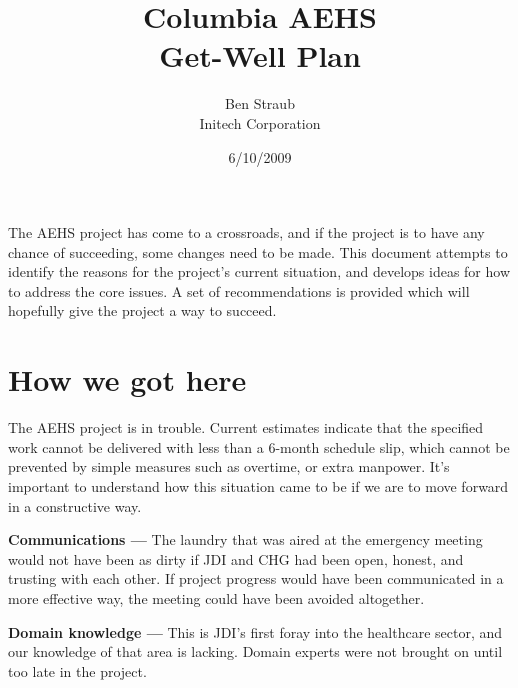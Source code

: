 \documentclass[12pt]{article}
\begin{document}

\title{Columbia AEHS\\Get-Well Plan}
\author{Ben Straub\\Initech Corporation}
\date{6/10/2009}
\maketitle
\thispagestyle{empty}



\vskip 1in

\todo{} The AEHS project has come to a crossroads, and if the project is to have any chance of
succeeding, some changes need to be made.  This document attempts to identify the reasons for the
project's current situation, and develops ideas for how to address the core issues.  A set of
recommendations is provided which will hopefully give the project a way to succeed.

\clearpage

\setcounter{tocdepth}{1}
\tableofcontents

\clearpage


\section{How we got here}

The AEHS project is in trouble.  Current estimates indicate that the specified work cannot be
delivered with less than a 6-month schedule slip, which cannot be prevented by simple measures such
as overtime, or extra manpower.  It's important to understand how this situation came to be if we
are to move forward in a constructive way.
\todo{}

{\bf Communications ---} The laundry that was aired at the emergency meeting would not have been as
dirty if JDI and CHG had been open, honest, and trusting with each other.  If project progress would
have been communicated in a more effective way, the meeting could have been avoided altogether.
\todo{}

{\bf Domain knowledge ---} This is JDI's first foray into the healthcare sector, and our knowledge
of that area is lacking.  Domain experts were not brought on until too late in the project.
\todo{}
\end{document}
